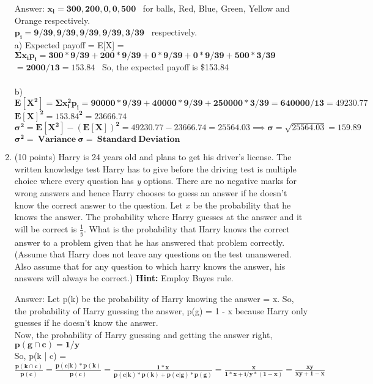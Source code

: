 \documentclass{article}%
\begin{document}
\begin{enumerate}
    Answer: $\mathbf{ x_i = 300, 200, 0, 0, 500 }$ \ for balls, Red, Blue, Green, Yellow and Orange respectively. \\
    $\mathbf{ p_i = 9/39, 9/39, 9/39, 9/39, 3/39 }$ \ respectively. \\
    a) Expected payoff = E[X] = $\mathbf{ \Sigma x_i p_i = 300 * 9/39 + 200 * 9/39 + 0 * 9/39 + 0 * 9/39 + 500 * 3/39}$ \\
    $\mathbf{ = 2000/13 = 153.84 }$ \ So, the expected payoff is \$153.84 \\ \\
    b) $\mathbf{ E[X^2] = \Sigma x_i ^2 p_i = 90000 * 9/39 + 40000 * 9/39 + 250000 * 3/39 = 640000 / 13 = 49230.77 }$ \\
    $\mathbf{ E[X]^2 = 153.84^2 = 23666.74 }$ \\
    $\mathbf{ \sigma ^2 = E[X^2] - (E[X])^2 = 49230.77 - 23666.74 = 25564.03 \implies \sigma = \sqrt{25564.03} = 159.89 }$ \\
    $\mathbf{ \sigma ^2 = \ Variance \ \sigma = \ Standard \ Deviation }$

    \item (10 points) Harry is 24 years old and plans to get his driver's license. The written knowledge test Harry has to give before the driving test is multiple choice where every question has \emph{y} options. There are no negative marks for wrong answers and hence Harry chooses to guess an answer if he doesn't know the correct answer to the question. Let $x$ be the probability that he knows the answer. The probability where Harry guesses at the answer and it will be correct is $\frac{1}{y}$. What is the probability that Harry knows the correct answer to a problem given that he has answered that problem correctly.
    (Assume that Harry does not leave any questions on the test unanswered. Also assume that for any question to which harry knows the answer, his answers will always be correct.) \textbf{Hint:} Employ Bayes rule.

    Answer: Let p(k) be the probability of Harry knowing the answer = x. So, the probability of Harry guessing the answer, p(g) = 1 - x because Harry only guesses if he doesn't know the answer. \\
    Now, the probability of Harry guessing and getting the answer right, $\mathbf{ p(g \cap c) = 1 / y}$ \\
    So, p(k | c) = $\mathbf{ \frac{p(k \cap c)}{p(c)} = \frac{p(c | k) * p(k)}{p(c)} = \frac{1 * x}{p(c | k) * p(k) + p(c | g) * p(g)} = \frac{x}{1 * x + i/y * (1-x)} = \frac{xy}{xy + 1 - x} }$
    

\end{enumerate}
\end{document}

